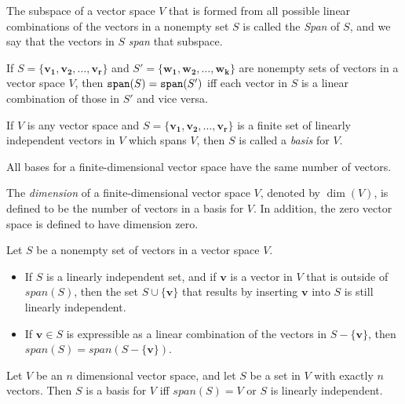 \documentclass{report}
\begin{document}
		\begin{defn}[Span]
			The subspace of a vector space $V$ that is formed from all possible linear combinations of the vectors in a nonempty set $S$ is called the \emph{Span} of $S$, and we say that the vectors in $S$ \emph{span} that subspace.
		\end{defn}
	
		\begin{thm}
			If $S=\{\bm{v_1}, \bm{v_2}, \dots, \bm{v_r}\}$ and $S'=\{\bm{w_1}, \bm{w_2}, \dots, \bm{w_k}\}$ are nonempty sets of vectors in a vector space $V$, then $\verb|span|(S)=\verb|span|(S')$ iff each vector in $S$ is a linear combination of those in $S'$ and vice versa.
		\end{thm}

		\begin{defn}[Basis]\label{def_basis}
			If $V$ is any vector space and $S=\{\bm{v_1}, \bm{v_2}, \dots, \bm{v_r}\}$ is a finite set of linearly independent vectors in $V$ which spans $V$, then $S$ is called a \emph{basis} for $V$.
		\end{defn}
	
		\begin{thm}
			All bases for a finite-dimensional vector space have the same number of vectors.
		\end{thm}
		
		\begin{defn}[Dimension]
			The \emph{dimension} of a finite-dimensional vector space $V$, denoted by $\dim (V)$, is defined to be the number of vectors in a basis for $V$. In addition, the zero vector space is defined to have dimension zero.
		\end{defn}
		
		\begin{thm}
			Let $S$ be a nonempty set of vectors in a vector space $V$.
			\begin{itemize}
				\item If $S$ is a linearly independent set, and if $\bm{v}$ is a vector in $V$ that is outside of $span(S)$, then the set $S \cup \{\bm{v}\}$ that results by inserting $\bm{v}$ into $S$ is still linearly independent.
				\item If $\bm{v} \in S$ is expressible as a linear combination of the vectors in $S-\{\bm{v}\}$, then $span(S)=span(S-\{\bm{v}\})$.
			\end{itemize}
		\end{thm}
		
		\begin{thm}
			Let $V$ be an $n$ dimensional vector space, and let $S$ be a set in $V$ with exactly $n$ vectors. Then $S$ is a basis for $V$ iff $span(S)=V$ or $S$ is linearly independent.
		\end{thm}
		
\end{document}
